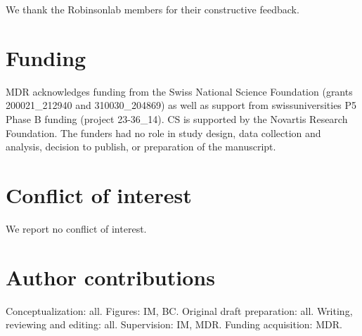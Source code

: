 \documentclass[11pt]{article}
\begin{document}
We thank the Robinsonlab members for their constructive feedback.

\section*{Funding}
MDR acknowledges funding from the Swiss National Science Foundation (grants 200021\_212940 and 310030\_204869) as well as support from swissuniversities P5 Phase B funding (project 23-36\_14). CS is supported by the Novartis Research Foundation. The funders had no role in study design, data collection and analysis, decision to publish, or preparation of the manuscript.

\section*{Conflict of interest}

We report no conflict of interest.

\section*{Author contributions}

Conceptualization: all. Figures: IM, BC. Original draft preparation: all. Writing, reviewing and editing: all. Supervision: IM, MDR. Funding acquisition: MDR.



\pagebreak
\linespread{1} 




%
\end{document}
